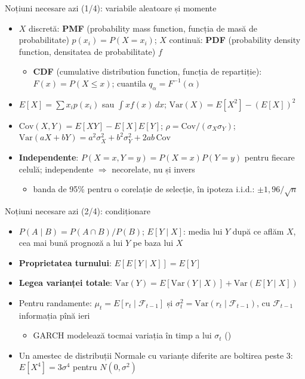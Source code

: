 \begin{frame}{Noțiuni necesare azi (1/4): variabile aleatoare și momente}
\itemsize{\footnotesize}
\begin{itemize}
    \item $X$ discretă: \textbf{PMF} (probability mass function, funcția de masă de probabilitate) $p(x_i) = P(X = x_i)$; $X$ continuă: \textbf{PDF} (probability density function, densitatea de probabilitate) $f$
    \begin{itemize}
        \item \textbf{CDF} (cumulative distribution function, funcția de repartiție): $F(x) = P(X \le x)$; cuantila $q_\alpha = F^{-1}(\alpha)$
    \end{itemize}
    \item $E[X] = \sum x_i p(x_i)$ sau $\int x f(x)\,dx$; $\text{Var}(X) = E[X^2] - (E[X])^2$
    \item $\text{Cov}(X, Y) = E[XY] - E[X]E[Y]$; $\rho = \text{Cov}/(\sigma_X\sigma_Y)$; $\text{Var}(aX + bY) = a^2\sigma_X^2 + b^2\sigma_Y^2 + 2ab\,\text{Cov}$
    \item \textbf{Independente}: $P(X = x, Y = y) = P(X = x)P(Y = y)$ pentru fiecare celulă; independente $\Rightarrow$ necorelate, nu și invers
    \begin{itemize}
        \item banda de 95\% pentru o corelație de selecție, în ipoteza i.i.d.: $\pm 1{,}96/\sqrt{n}$
    \end{itemize}
\end{itemize}
\end{frame}

\begin{frame}{Noțiuni necesare azi (2/4): condiționare}
\itemsize{\footnotesize}
\begin{itemize}
    \item $P(A \mid B) = P(A \cap B)/P(B)$; $E[Y \mid X]$: media lui $Y$ după ce aflăm $X$, cea mai bună prognoză a lui $Y$ pe baza lui $X$
    \item \textbf{Proprietatea turnului}: $E[E[Y \mid X]] = E[Y]$
    \item \textbf{Legea varianței totale}: $\text{Var}(Y) = E[\text{Var}(Y \mid X)] + \text{Var}(E[Y \mid X])$
    \item Pentru randamente: $\mu_t = E[r_t \mid \mathcal{F}_{t-1}]$ și $\sigma_t^2 = \text{Var}(r_t \mid \mathcal{F}_{t-1})$, cu $\mathcal{F}_{t-1}$ informația pînă ieri
    \begin{itemize}
        \item GARCH modelează tocmai variația în timp a lui $\sigma_t$ ()
    \end{itemize}
    \item Un amestec de distribuții Normale cu varianțe diferite are boltirea peste 3: $E[X^4] = 3\sigma^4$ pentru $N(0, \sigma^2)$
\end{itemize}
\end{frame}

